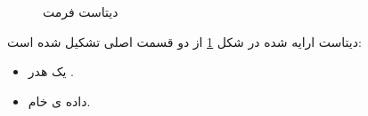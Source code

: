 \begin{figure}[t!]
	\centering
	\removevspace[1]
	\caption{دیتاست فرمت }
	\label{fig:ismrmrd-dataset}
\end{figure}

دیتاست ارایه شده در شکل \ref{fig:ismrmrd-dataset} از دو قسمت اصلی تشکیل شده است:

\removevspace[1]
\begin{itemize}
	\item 
	یک هدر .
	\item 
	داده ی خام.
\end{itemize}

\begin{figure}[t!]
	\centering
	\caption{}
	\label{fig:ismrmrd-encodedspace}
\end{figure}




